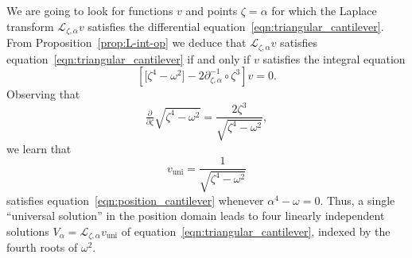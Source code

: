 \documentclass{article}
\newcommand{\fracderiv}[3]{\partial^{#1}_{#2, #3}}
\newcommand{\laplace}{\mathcal{L}}
\theoremstyle{definition}
\theoremstyle{plain}
\newenvironment{todo}{\color{Coral}}{\color{black}}
\begin{document}
\color{black}
We are going to look for functions $v$ and points $\zeta = \alpha$ for which the Laplace transform $\laplace_{\zeta, \alpha} v$ satisfies the differential equation~\eqref{eqn:triangular_cantilever}. From Proposition~\ref{prop:L-int-op} we deduce that $\laplace_{\zeta, \alpha} v$ satisfies equation~\eqref{eqn:triangular_cantilever} if and only if $v$ satisfies the integral equation
\begin{equation}\label{eqn:position_cantilever}
    \left[ \big[ \zeta^4 - \omega^2 \big] - 2\fracderiv{-1}{\zeta}{\alpha} \circ \zeta^3 \right] v = 0.
\end{equation}
Observing that
\[ \tfrac{\partial}{\partial \zeta} \sqrt{\zeta^4 - \omega^2} = \frac{2\zeta^3}{\sqrt{\zeta^4 - \omega^2}}, \]
we learn that
\[ v_\text{uni} = \frac{1}{\sqrt{\zeta^4 - \omega^2}} \]
satisfies equation~\eqref{eqn:position_cantilever} whenever $\alpha^4 - \omega = 0$. Thus, a single ``universal solution'' in the position domain leads to four linearly independent solutions $V_\alpha = \laplace_{\zeta, \alpha} v_\text{uni}$ of equation~\eqref{eqn:triangular_cantilever}, indexed by the fourth roots of $\omega^2$.
\begin{todo}\par[Stokes? Thimbles? Mathematica gives solution ${}_0 F_3\big(; \tfrac{1}{2}, \tfrac{3}{4}, \tfrac{3}{4}; \tfrac{1}{16} z^4\big)$.]\end{todo}
%
\appendix
%
\end{document}
